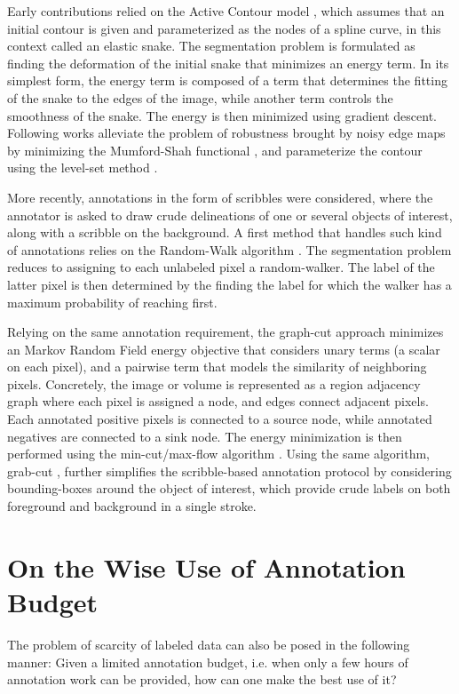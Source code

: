 Early contributions relied on the Active Contour model \cite{kass88}, which assumes that an initial contour is given and parameterized as the nodes of a spline curve, in this context called an elastic snake.
The segmentation problem is formulated as finding the deformation of the initial snake that minimizes an energy term.
In its simplest form, the energy term is composed of a term that determines the fitting of the snake to the edges of the image, while another term controls the smoothness of the snake.
The energy is then minimized using gradient descent.
Following works alleviate the problem of robustness brought by noisy edge maps by minimizing the Mumford-Shah functional \cite{chan01}, and parameterize the contour using the level-set method \cite{osher88}.

More recently, annotations in the form of scribbles were considered, where the annotator is asked to draw crude delineations of one or several objects of interest, along with a scribble on the background.
A first method that handles such kind of annotations relies on the Random-Walk algorithm \cite{grady06}.
The segmentation problem reduces to assigning to each unlabeled pixel a random-walker. The label of the latter pixel is then determined by the finding the label for which the walker has a maximum probability of reaching first.

Relying on the same annotation requirement, the graph-cut approach \cite{Boykov2006}
minimizes an Markov Random Field energy objective that considers unary terms (a scalar on each pixel), and a pairwise term that models the similarity of neighboring pixels.
Concretely, the image or volume is represented as a region adjacency graph where each pixel is assigned a node, and edges connect adjacent pixels.
Each annotated positive pixels is connected to a source node, while annotated negatives are connected to a sink node.
The energy minimization is then performed using the min-cut/max-flow algorithm \cite{goldberg88}.
Using the same algorithm, grab-cut \cite{rother04}, further simplifies the scribble-based annotation protocol by considering bounding-boxes around the object of interest, which provide crude labels on both foreground and background in a single stroke.

\section{On the Wise Use of Annotation Budget}
The problem of scarcity of labeled data can also be posed in the following manner:
Given a limited annotation budget, i.e. when only a few hours of annotation work can be provided, how can one make the best use of it?

